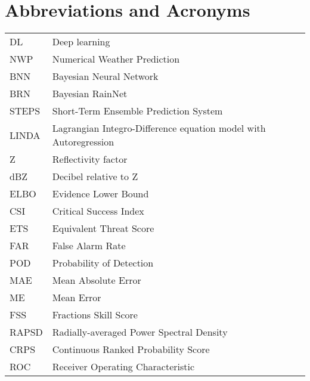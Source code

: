 \chapter*{Abbreviations and Acronyms}


\noindent
\begin{longtable}{@{}p{}p{}@{}}
DL & Deep learning \\
NWP & Numerical Weather Prediction \\
BNN & Bayesian Neural Network \\
BRN & Bayesian RainNet \\
STEPS & Short-Term Ensemble Prediction System \\
LINDA & Lagrangian Integro-Difference equation model with Autoregression\\
Z & Reflectivity factor \\
dBZ & Decibel relative to Z \\
ELBO & Evidence Lower Bound \\
CSI & Critical Success Index \\
ETS & Equivalent Threat Score \\
FAR & False Alarm Rate \\
POD & Probability of Detection \\
MAE & Mean Absolute Error \\
ME & Mean Error \\
FSS & Fractions Skill Score \\
RAPSD & Radially-averaged Power Spectral Density \\
CRPS & Continuous Ranked Probability Score \\
ROC & Receiver Operating Characteristic \\
 

\end{longtable}
